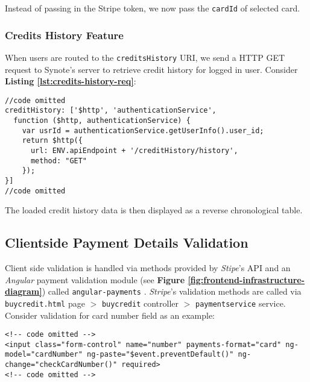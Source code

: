 Instead of passing in the Stripe token, we now pass the \texttt{cardId} of selected card.

\subsubsection{Credits History Feature}
\label{subsubsec:credits-history-feature}

When users are routed to the \texttt{creditsHistory} URI, we send a HTTP GET request to Synote’s server to retrieve credit history for logged in user. Consider \textbf{Listing \ref{lst:credits-history-req}}:\\

\begin{listing}[H]
\begin{verbatim}
//code omitted
creditHistory: ['$http', 'authenticationService',
  function ($http, authenticationService) {
    var usrId = authenticationService.getUserInfo().user_id;
    return $http({
      url: ENV.apiEndpoint + '/creditHistory/history',
      method: "GET"
    });
}]
//code omitted
\end{verbatim}
\label{lst:credits-history-req}
\end{listing}

The loaded credit history data is then displayed as a reverse chronological table.

\subsection{Clientside Payment Details Validation}
\label{subsec:clientside-payment-details-validation}

Client side validation is handled via methods provided by \textit{Stipe}’s API and an \textit{Angular} payment validation module  (see \textbf{Figure \ref{fig:frontend-infrastructure-diagram}}) called \texttt{angular-payments} \cite{angularpayments}. \textit{Stripe}’s validation methods are called via \texttt{buycredit.html} page $>$ \texttt{buycredit} controller $>$ \texttt{paymentservice} service. Consider validation for card number field as an example:

\begin{listing}[H]
\begin{verbatim}
<!-- code omitted -->
<input class="form-control" name="number" payments-format="card" ng-model="cardNumber" ng-paste="$event.preventDefault()" ng-change="checkCardNumber()" required>
<!-- code omitted -->
\end{verbatim}
\label{lst:buycredit-html-cardnumber-input}
\end{listing}

